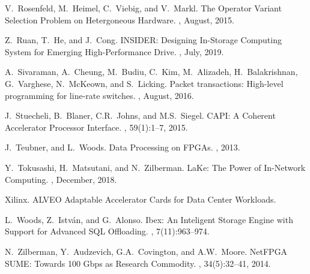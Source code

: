 \documentclass[11pt,dvipdfmx]{article}
\begin{document}
\begin{thebibliography}{10}
\begin{small}
 V.~Rosenfeld, M.~Heimel, C.~Viebig, and V.~Markl.
  \newblock The Operator Variant Selection Problem on Hetergoneous Hardware.
  , August, 2015.

 Z.~Ruan, T.~He, and J.~Cong.
  \newblock INSIDER: Designing In-Storage Computing System for Emerging High-Performance Drive.
  , July, 2019.

 A.~Sivaraman, A.~Cheung, M.~Budiu, C.~Kim, M.~Alizadeh, H.~Balakrishnan, G.~Varghese, N.~McKeown, and S.~Licking.
  \newblock Packet transactions: High-level programming for line-rate switches.
  , August, 2016.

 J.~Stuecheli, B.~Blaner, C.R.~Johns, and M.S.~Siegel.
  \newblock CAPI: A Coherent Accelerator Processor Interface.
  , 59(1):1--7, 2015.

 J.~Teubner, and L.~Woods.
  \newblock Data Processing on FPGAs.
  , 2013.

 Y.~Tokusashi, H.~Matsutani, and N.~Zilberman.
  \newblock LaKe: The Power of In-Network Computing.
  , December, 2018.

 Xilinx.
  \newblock ALVEO Adaptable Accelerator Cards for Data Center Workloads.

 L.~Woods, Z.~Istv\'an, and G.~Alonso.
  \newblock Ibex: An Inteligent Storage Engine with Support for Advanced SQL Offloading.
  , 7(11):963--974.

 N.~Zilberman, Y.~Audzevich, G.A.~Covington, and A.W.~Moore.
  \newblock NetFPGA SUME: Towards 100 Gbps as Research Commodity.
  , 34(5):32--41, 2014.

\end{small}
\end{thebibliography}
\end{document}
